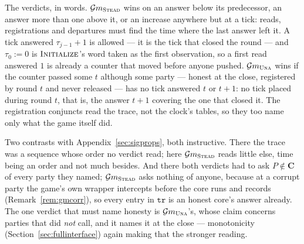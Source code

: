 \documentclass[11pt,a4paper]{article}
\newcommand{\Cs}{\mathbf{C}}
\newcommand{\op}[1]{\textsc{#1}}
\newcommand{\Gm}{\mathcal{G}m}
\newcommand{\V}[1]{\mathtt{#1}}
\theoremstyle{accentdef}
\theoremstyle{accentplain}
\begin{document}
The verdicts, in words. $\Gm_{\op{Stead}}$ wins on an answer below its predecessor, an answer
more than one above it, or an increase anywhere but at a tick: reads, registrations and
departures must find the time where the last answer left it. A tick answered $\tau_{j-1}+1$ is
allowed --- it is the tick that closed the round --- and $\tau_0 := 0$ is $\op{Initialize}$'s
word taken as the first observation, so a first read answered $1$ is already a counter that moved
before anyone pushed. $\Gm_{\op{Una}}$ wins if the counter passed some $t$ although some party
--- honest at the close, registered by round $t$ and never released --- has no tick answered $t$
or $t+1$: no tick placed during round $t$, that is, the answer $t+1$ covering the one that closed
it. The registration conjuncts read the trace, not the clock's tables, so they too name only what
the game itself did.

Two contrasts with Appendix~\ref{sec:sigprops}, both instructive. There the trace was a sequence
whose order no verdict read; here $\Gm_{\op{Stead}}$ reads little else, time being an order and
not much besides. And there both verdicts had to ask $P \notin \Cs$ of every party they named;
$\Gm_{\op{Stead}}$ asks nothing of anyone, because at a corrupt party the game's own wrapper
intercepts before the core runs and records (Remark~\ref{rem:gmcorr}), so every entry in $\V{tr}$
is an honest core's answer already. The one verdict that must name honesty is $\Gm_{\op{Una}}$'s,
whose claim concerns parties that did \emph{not} call, and it names it at the close ---
monotonicity (Section~\ref{sec:fullinterface}) again making that the stronger reading.
\end{document}
